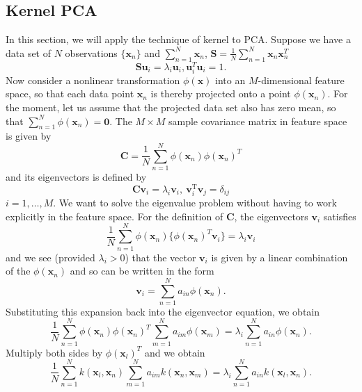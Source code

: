 \documentclass[a4paper]{book}
\newcommand{\mrm}{\mathrm}
\newcommand{\mbf}{\mathbf}
\newcommand{\CC}{\mbf C}
\newcommand{\uu}{\mbf u}
\newcommand{\vv}{\mbf v}
\newcommand{\xx}{\mbf x}
\begin{document}
\subsection{Kernel PCA}
In this section, we will apply the technique of kernel to PCA.\newline
Suppose we have a data set of $N$ observations $\{\xx_n\}$ and $\sum_{n=1}^{N}\xx_n$, $\mbf S=\frac{1}{N}\sum_{n=1}^{N}\xx_n\xx_n^T$ \newline
\begin{equation}\label{}
  \mbf S\uu_i=\lambda_i\uu_i, \uu_i^T\uu_i = 1.
\end{equation}
Now consider a nonlinear transformation $\phi(\xx)$ into an $M$-dimensional feature space, so that each data point $\xx_n$ is thereby projected onto a point $\phi(\xx_n)$.
For the moment, let us assume that the projected data set also has zero mean, so that $\sum_{n=1}^{N}\phi(\xx_n) = \mbf 0$. The $M\times M$ sample covariance matrix in feature space is given by
\begin{equation}\label{}
  \CC = \frac{1}{N}\sum_{n=1}^{N}\phi(\xx_n)\phi(\xx_n)^T
\end{equation}
and its eigenvectors is defined by
\begin{equation}\label{}
  \CC\vv_i=\lambda_i\vv_i,\ \vv_i^\mrm{T}\vv_j=\delta_{ij}
\end{equation}
$i=1, \dots, M$. We want to solve the eigenvalue problem without having to work explicitly in the feature space. For the definition of $\CC$, the eigenvectors $\vv_i$ satisfies
\begin{equation}\label{}
  \frac{1}{N}\sum_{n=1}^{N}\phi(\xx_n)\{\phi(\xx_n)^T\vv_i\} = \lambda_i\vv_i
\end{equation}
and we see (provided $\lambda_i>0$) that the vector $\vv_i$ is given by a linear combination of the $\phi(\xx_n)$ and so can be written in the form
\begin{equation}\label{}
  \vv_i=\sum_{n=1}^{N}a_{in}\phi(\xx_n).
\end{equation}
Substituting this expansion back into the eigenvector equation, we obtain
\begin{equation}\label{}
  \frac1N\sum_{n=1}^{N}\phi(\xx_n)\phi(\xx_n)^T\sum_{m=1}^{N}a_{im}\phi(\xx_m) = \lambda_i\sum_{n=1}^{N}a_{in}\phi(\xx_n).
\end{equation}
Multiply both sides by $\phi(\xx_l)^T$ and we obtain
\begin{equation}\label{}
  \frac1N\sum_{n=1}^{N}k(\xx_l,\xx_n)\sum_{m=1}^{N}a_{im}k(\xx_n,\xx_m) = \lambda_i\sum_{n=1}^{N}a_{in}k(\xx_l,\xx_n).
\end{equation}
\end{document}
